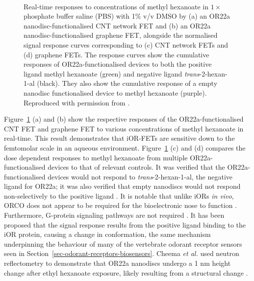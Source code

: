 \documentclass[
  a4paper,
]{scrbook}
\begin{document}
\begin{figure}
\begin{minipage}[t]{0.45\linewidth}
{{}

}

\end{minipage}%
%
\begin{minipage}[t]{0.01\linewidth}

{\centering 

~

}

\end{minipage}%

\caption{\label{fig-iOR-sensing-literature}Real-time responses to
concentrations of methyl hexanoate in \(1 \times\) phosphate buffer
saline (PBS) with 1\% v/v DMSO by (a) an OR22a nanodisc-functionalised
CNT network FET and (b) an OR22a nanodisc-functionalised graphene FET,
alongside the normalised signal response curves corresponding to (c) CNT
network FETs and (d) graphene FETs. The response curves show the
cumulative responses of OR22a-functionalised devices to both the
positive ligand methyl hexanoate (green) and negative ligand
\emph{trans}-2-hexan-1-al (black). They also show the cumulative
response of a empty nanodisc functionalised device to methyl hexanoate
(purple). Reproduced with permission from
\autocite{Murugathas2019a,Murugathas2020}.}

\end{figure}

Figure~\ref{fig-iOR-sensing-literature} (a) and (b) show the respective
responses of the OR22a-functionalised CNT FET and graphene FET to
various concentrations of methyl hexanoate in real-time. This result
demonstrates that iOR-FETs are sensitive down to the femtomolar scale in
an aqueous environment. Figure~\ref{fig-iOR-sensing-literature} (c) and
(d) compares the dose dependent responses to methyl hexanoate from
multiple OR22a-functionalised devices to that of relevant controls. It
was verified that the OR22a-functionalised devices would not respond to
\emph{trans}-2-hexan-1-al, the negative ligand for OR22a; it was also
verified that empty nanodiscs would not respond non-selectively to the
positive ligand \autocite{Murugathas2019a,Murugathas2020}. It is notable
that unlike iORs \emph{in vivo}, ORCO does not appear to be required for
the bioelectronic nose to function
\autocite{Murugathas2019a,Murugathas2020,Khadka2019,Cheema2021}.
Furthermore, G-protein signaling pathways are not required
\autocite{Sato2014}. It has been proposed that the signal response
results from the positive ligand binding to the iOR protein, causing a
change in conformation, the same mechanism underpinning the behaviour of
many of the vertebrate odorant receptor sensors seen in
Section~\ref{sec-odorant-receptors-biosensors}. Cheema \emph{et al.}
used neutron reflectometry to demonstrate that OR22a nanodiscs undergo a
1 nm height change after ethyl hexanoate exposure, likely resulting from
a structural change \autocite{Cheema2021}.
\end{document}
